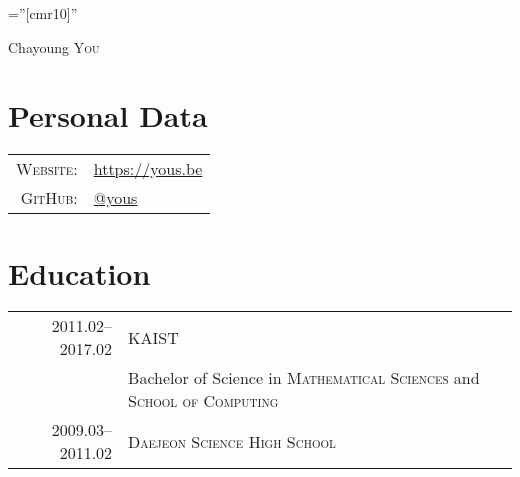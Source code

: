 \documentclass[a4paper,10pt]{article}
\begin{document}

\pagestyle{empty} %

\font\fb=''[cmr10]'' %

\par{\centering
  {\Huge Chayoung \textsc{You}
}\bigskip\par}

\section{Personal Data}

\begin{tabular}{rl}
  \textsc{Website:} & \url{https://yous.be} \\
  \textsc{GitHub:}  & \href{https://github.com/yous}{@yous} \\
\end{tabular}

\section{Education}
\begin{tabular}{rl}
  2011.02--2017.02 & \textsc{KAIST} \\
                   & Bachelor of Science in \textsc{Mathematical Sciences} and \textsc{School of Computing} \\
  2009.03--2011.02 & \textsc{Daejeon Science High School}
\end{tabular}

\end{document}
